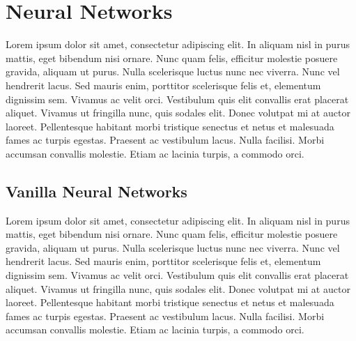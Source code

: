 \section{Neural Networks}\label{sec:3.7}
\vspace{-0.5cm}
\noindent Lorem ipsum dolor sit amet, consectetur adipiscing elit. In aliquam nisl in purus mattis, eget bibendum nisi ornare. Nunc quam felis, efficitur molestie posuere gravida, aliquam ut purus. Nulla scelerisque luctus nunc nec viverra. Nunc vel hendrerit lacus. Sed mauris enim, porttitor scelerisque felis et, elementum dignissim sem. Vivamus ac velit orci. Vestibulum quis elit convallis erat placerat aliquet. Vivamus ut fringilla nunc, quis sodales elit. Donec volutpat mi at auctor laoreet. Pellentesque habitant morbi tristique senectus et netus et malesuada fames ac turpis egestas. Praesent ac vestibulum lacus. Nulla facilisi. Morbi accumsan convallis molestie. Etiam ac lacinia turpis, a commodo orci.

\vspace{-0.3cm}


\subsection{Vanilla Neural Networks}\label{sec:3.7.1}
\vspace{-0.5cm}
\noindent  Lorem ipsum dolor sit amet, consectetur adipiscing elit. In aliquam nisl in purus mattis, eget bibendum nisi ornare. Nunc quam felis, efficitur molestie posuere gravida, aliquam ut purus. Nulla scelerisque luctus nunc nec viverra. Nunc vel hendrerit lacus. Sed mauris enim, porttitor scelerisque felis et, elementum dignissim sem. Vivamus ac velit orci. Vestibulum quis elit convallis erat placerat aliquet. Vivamus ut fringilla nunc, quis sodales elit. Donec volutpat mi at auctor laoreet. Pellentesque habitant morbi tristique senectus et netus et malesuada fames ac turpis egestas. Praesent ac vestibulum lacus. Nulla facilisi. Morbi accumsan convallis molestie. Etiam ac lacinia turpis, a commodo orci.


\vspace{-0.3cm}


